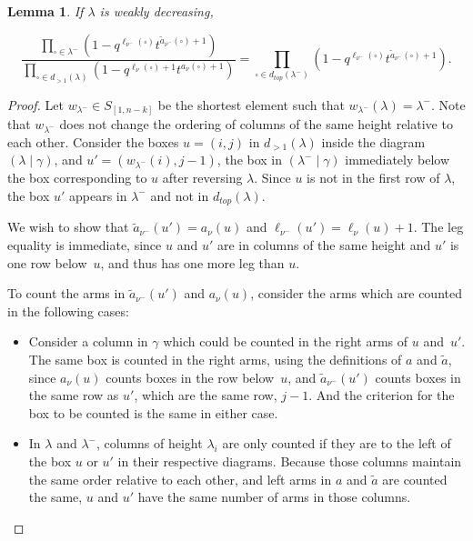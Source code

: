 \documentclass[11pt]{article}
\newtheorem{lemm}[theo]{Lemma}
\theoremstyle{definition}
\numberwithin{equation}{section}
\newcommand{\Sn}{S_{[1,n-k]}}
\newcommand{\numin}{{\nu^-}}
\newcommand{\nudom}{{( \lambda \mid \gamma )}}
\newcommand{\nuantidom}{{(\lambda^- \mid \gamma)}}
\newcommand{\legnu}{{\ell_\nu(\square)}}
\newcommand{\legnumin}{{\ell_{\nu^-}(\square)}}
\newcommand{\armonenumin}{{\widetilde{a}_{\nu^-}(\square)}}
\newcommand{\armtwonu}{{a_\nu(\square)}}
\newcommand{\symmetricprod}{\prod\limits_{\square \in \lambda^-}}
\begin{document}
\begin{lemm}\label{lambdalemma} If $\lambda$ is weakly decreasing,

\begin{equation}\label{lambdaequality}\frac{\symmetricprod (1-q^{\legnumin}t^{\armonenumin + 1}) }{  \prod\limits_{\square \in d_{>1}(\lambda)} \left(1-q^{\legnu+1}t^{\armtwonu +1} \right)  } = \prod\limits_{\square \in d_{top}(\lambda^-)} (1-q^\legnumin t^{\armonenumin + 1}).\end{equation}\end{lemm}

\begin{proof}
Let $w_{\lambda^-}\in \Sn$ be the shortest element such that $w_{\lambda^-}(\lambda)=\lambda^-$. Note that $w_{\lambda^-}$ does not change the ordering of columns of the same height relative to each other. Consider the boxes $u=(i,j)$ in $d_{>1}(\lambda)$ inside the diagram $\nudom$, and $u'=(w_{\lambda^-}(i),j-1)$, the box in $\nuantidom$ immediately below the box corresponding to $u$ after reversing $\lambda$. Since $u$ is not in the first row of $\lambda$, the box $u'$ appears in $\lambda^-$ and not in $d_{top}(\lambda)$.

We wish to show that $\widetilde{a}_\numin(u')=a_\nu(u)$ and $\ell_{\numin}(u')=\ell_\nu(u)+1$. The leg equality is immediate, since $u$ and $u'$ are in columns of the same height and $u'$ is one row below~$u$, and thus has one more leg than $u$.

To count the arms in $\widetilde{a}_\numin(u')$ and $a_\nu(u)$, consider the arms which are counted in the following cases:

\begin{itemize} \item Consider a column in $\gamma$ which could be counted in the right arms of $u$ and~$u'$. The same box is counted in the right arms, using the definitions of $a$ and $\widetilde{a}$, since $a_\nu(u)$ counts boxes in the row below~$u$, and $\widetilde{a}_\numin(u')$ counts boxes in the same row as $u'$, which are the same row, $j-1$. And the criterion for the box to be counted is the same in either case.

\item In $\lambda$ and $\lambda^-$, columns of height $\lambda_i$ are only counted if they are to the left of the box $u$ or $u'$ in their respective diagrams. Because those columns maintain the same order relative to each other, and left arms in $a$ and $\widetilde{a}$ are counted the same, $u$ and $u'$ have the same number of arms in those columns. 


\end{itemize}
\end{proof}
\end{document}

